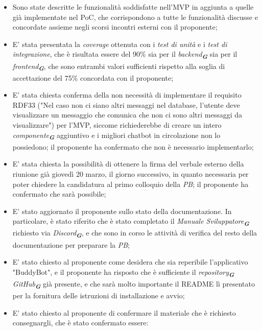 \begin{itemize}
\begin{itemize}
    \end{itemize}
    \item Sono state descritte le funzionalità soddisfatte nell'MVP in aggiunta a quelle già implementate nel PoC, che corrispondono a tutte le funzionalità discusse e concordate assieme negli scorsi incontri esterni con il proponente;
    \item E' stata presentata la \emph{coverage} ottenuta con i \emph{test di unità} e i \emph{test di integrazione}, che è risultata essere del 90\% sia per il \emph{backend}\textsubscript{\textbf{\textit{G}}} sia per il \emph{frontend}\textsubscript{\textbf{\textit{G}}}, che sono entrambi valori sufficienti rispetto alla soglia di accettazione del 75\% concordata con il proponente;
    \item E' stata chiesta conferma della non necessità di implementare il requisito RDF33 ("Nel caso non ci siano altri messaggi nel database, l'utente deve visualizzare un messaggio che comunica che non ci sono altri messaggi da visualizzare") per l'MVP, siccome richiederebbe di creare un intero \emph{componente}\textsubscript{\textbf{\textit{G}}} aggiuntivo e i migliori chatbot in circolazione non lo possiedono; il proponente ha confermato che non è necessario implementarlo;
    \item E' stata chiesta la possibilità di ottenere la firma del verbale esterno della riunione già giovedì 20 marzo, il giorno successivo, in quanto necessaria per poter chiedere la candidatura al primo colloquio della \emph{PB}; il proponente ha confermato che sarà possibile;
    \item E' stato aggiornato il proponente sullo stato della documentazione. In particolare, è stato riferito che è stato completato il \emph{Manuale Sviluppatore}\textsubscript{\textbf{\textit{G}}} richiesto via \emph{Discord}\textsubscript{\textbf{\textit{G}}}, e che sono in corso le attività di verifica del resto della documentazione per preparare la \emph{PB};
    \item E' stato chiesto al proponente come desidera che sia reperibile l'applicativo "BuddyBot", e il proponente ha risposto che è sufficiente il \emph{repository}\textsubscript{\textbf{\textit{G}}} \emph{GitHub}\textsubscript{\textbf{\textit{G}}} già presente, e che sarà molto importante il README lì presentato per la fornitura delle istruzioni di installazione e avvio;
    \item E' stato chiesto al proponente di confermare il materiale che è richiesto consegnargli, che è stato confermato essere:
    \begin{itemize}

\end{itemize}
\end{itemize}
